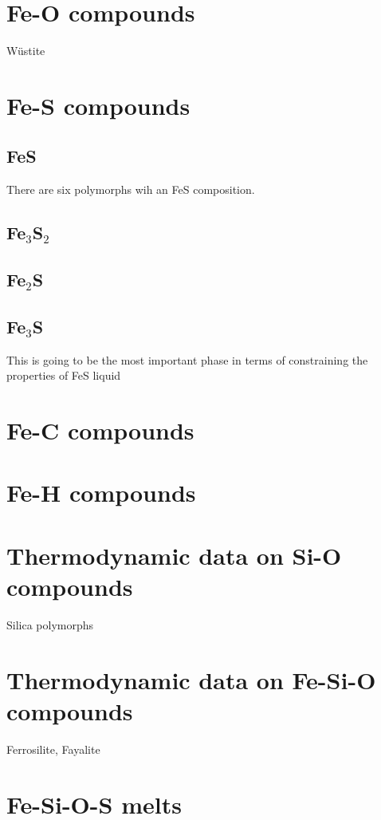 \documentclass[11pt,a4paper,english]{article}
\begin{document}
\section{Fe-O compounds}
W\"ustite

\section{Fe-S compounds}
\subsection{FeS}
There are six polymorphs wih an FeS composition. 

\subsection{Fe$_3$S$_2$}

\subsection{Fe$_2$S}

\subsection{Fe$_3$S}
This is going to be the most important phase in terms of constraining the properties of FeS liquid 

\section{Fe-C compounds}

\section{Fe-H compounds}

\section{Thermodynamic data on Si-O compounds}
Silica polymorphs

\section{Thermodynamic data on Fe-Si-O compounds}
Ferrosilite, Fayalite

\section{Fe-Si-O-S melts}
\end{document}
